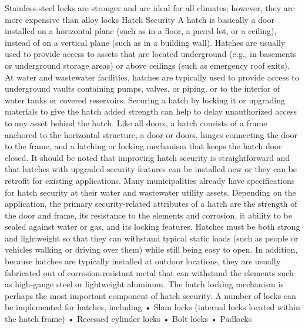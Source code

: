 \documentclass{article}
\begin{document}
Stainless-steel locks are stronger and are ideal for all climates;
however, they are more expensive than alloy locks Hatch Security A hatch
is basically a door installed on a horizontal plane (such as in a floor,
a paved lot, or a ceiling), instead of on a vertical plane (such as in a
building wall). Hatches are usually used to provide access to assets
that are located underground (e.g., in basements or underground storage
areas) or above ceilings (such as emergency roof exits). At water and
wastewater facilities, hatches are typically used to provide access to
underground vaults containing pumps, valves, or piping, or to the
interior of water tanks or covered reservoirs. Securing a hatch by
locking it or upgrading materials to give the hatch added strength can
help to delay unauthorized access to any asset behind the hatch. Like
all doors, a hatch consists of a frame anchored to the horizontal
structure, a door or doors, hinges connecting the door to the frame, and
a latching or locking mechanism that keeps the hatch door closed. It
should be noted that improving hatch security is straightforward and
that hatches with upgraded security features can be installed new or
they can be retrofit for existing applications. Many municipalities
already have specifications for hatch security at their water and
wastewater utility assets. Depending on the application, the primary
security-related attributes of a hatch are the strength of the door and
frame, its resistance to the elements and corrosion, it ability to be
sealed against water or gas, and its locking features. Hatches must be
both strong and lightweight so that they can withstand typical static
loads (such as people or vehicles walking or driving over them) while
still being easy to open. In addition, because hatches are typically
installed at outdoor locations, they are usually fabricated out of
corrosion-resistant metal that can withstand the elements such as
high-gauge steel or lightweight aluminum. The hatch locking mechanism is
perhaps the most important component of hatch security. A number of
locks can be implemented for hatches, including • Slam locks (internal
locks located within the hatch frame) • Recessed cylinder locks • Bolt
locks • Padlocks
\end{document}
